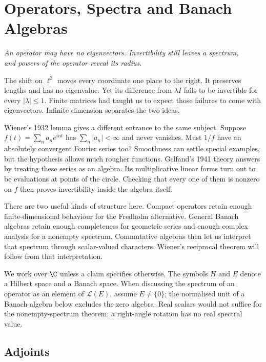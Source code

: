 \chapter{Operators, Spectra and Banach Algebras}\label{ch:operators}

\begin{center}\itshape
An operator may have no eigenvectors. Invertibility still leaves a spectrum,\\
and powers of the operator reveal its radius.
\end{center}

The shift on $\ell^2$ moves every coordinate one place to the right. It preserves lengths and has no eigenvalue. Yet its difference from $\lambda I$ fails to be invertible for every $|\lambda|\le1$. Finite matrices had taught us to expect those failures to come with eigenvectors. Infinite dimension separates the two ideas.

Wiener's 1932 lemma gives a different entrance to the same subject. Suppose $f(t)=\sum_na_ne^{int}$ has $\sum_n|a_n|<\infty$ and never vanishes. Must $1/f$ have an absolutely convergent Fourier series too? Smoothness can settle special examples, but the hypothesis allows much rougher functions. Gelfand's 1941 theory answers by treating these series as an algebra. Its multiplicative linear forms turn out to be evaluations at points of the circle. Checking that every one of them is nonzero on $f$ then proves invertibility inside the algebra itself.

There are two useful kinds of structure here. Compact operators retain enough finite-dimensional behaviour for the Fredholm alternative. General Banach algebras retain enough completeness for geometric series and enough complex analysis for a nonempty spectrum. Commutative algebras then let us interpret that spectrum through scalar-valued characters. Wiener's reciprocal theorem will follow from that interpretation.

We work over $\C$ unless a claim specifies otherwise. The symbols $H$ and $E$ denote a Hilbert space and a Banach space. When discussing the spectrum of an operator as an element of $\mathcal L(E)$, assume $E\ne\{0\}$; the normalised unit of a Banach algebra below excludes the zero algebra. Real scalars would not suffice for the nonempty-spectrum theorem: a right-angle rotation has no real spectral value.

\section{Adjoints}

